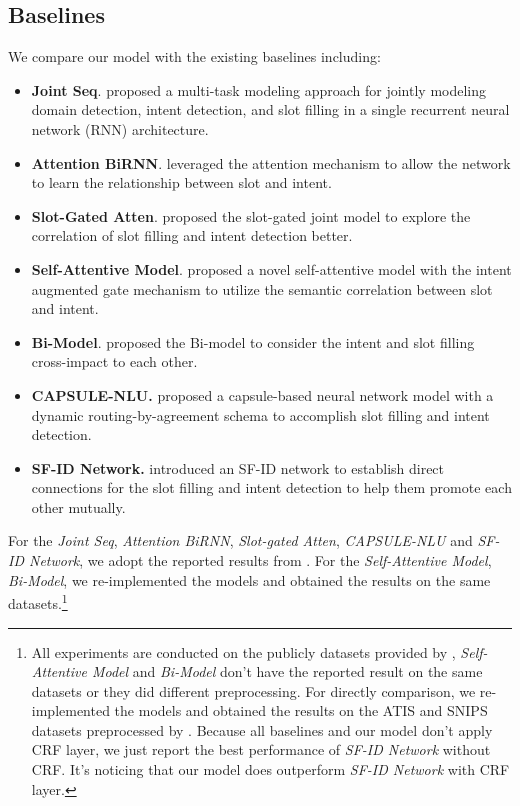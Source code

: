 \documentclass[11pt,a4paper]{article}
\begin{document}
\subsection{Baselines}
We compare our model with the existing  
baselines including:
\begin{itemize}
	
	\item \textbf{Joint Seq}.  
	proposed a multi-task modeling approach for jointly modeling domain detection, intent detection, and slot filling in a single recurrent neural network (RNN) architecture. 
	
	\item \textbf{Attention BiRNN}.  leveraged the 
	attention mechanism to allow the network to learn
	the relationship between slot and intent.
	
	\item \textbf{Slot-Gated Atten}.  proposed the slot-gated joint model to explore the correlation of slot filling and intent detection better. 
	
	\item \textbf{Self-Attentive Model}.  proposed 
	a novel self-attentive model with the intent augmented gate mechanism
	to utilize the semantic correlation between slot and 
	intent.
	
	\item \textbf{Bi-Model}.  proposed the 
	Bi-model to consider  the intent and slot 
	filling cross-impact to each other.
	
	\item \textbf{CAPSULE-NLU.}  proposed a capsule-based neural network model with a dynamic routing-by-agreement schema to accomplish slot filling and intent detection.
	
	\item \textbf{SF-ID Network.}  \cite{e-etal-2019-novel} introduced an SF-ID network to establish direct connections for the slot filling and intent detection to help them promote each other mutually.
	
\end{itemize}
For the \textit{Joint Seq}, \textit{Attention BiRNN}, \textit{Slot-gated Atten}, \textit{CAPSULE-NLU} and \textit{SF-ID Network}, we adopt the reported results from . For the \textit{Self-Attentive Model}, \textit{Bi-Model}, we re-implemented the models and obtained the results on the same datasets.\footnote{All experiments are conducted on the publicly datasets provided by , \textit{Self-Attentive Model} and \textit{Bi-Model} don't have the reported result on the same datasets or they did different preprocessing. For directly comparison, we re-implemented the models and obtained the results on the ATIS and SNIPS datasets preprocessed by \citet{goo2018slot}. Because all baselines and our model don't apply CRF layer, we just report the best performance of \textit{SF-ID Network} without CRF. It's noticing that our model does outperform \textit{SF-ID Network} with CRF layer.}
\end{document}
